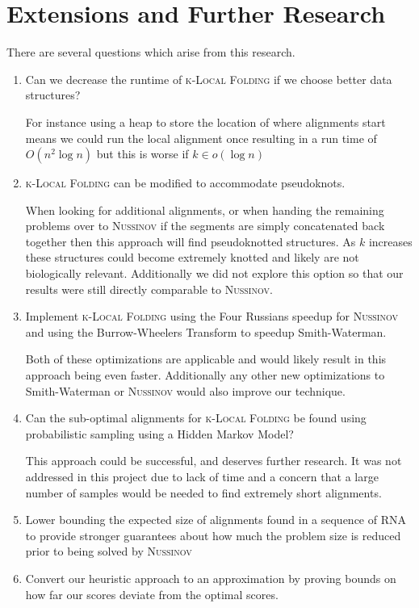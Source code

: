 \documentclass[11pt]{article}
\newcommand{\klf}{\textsc{k-Local Folding}\xspace}
\newcommand{\rf}{\textsc{Nussinov}\xspace}
\begin{document}
\section{Extensions and Further Research}
There are several questions which arise from this research. 
\begin{enumerate}
\item Can we decrease the runtime of \klf if we choose better data structures?

\vskip 0.25cm

For instance using a heap to store the location of where alignments start means we could run the local alignment once resulting in a run time of $O(n^{2}\log n)$ but this is worse if $k \in o(\log n)$


\item \klf can be modified to accommodate pseudoknots. 

\vskip 0.25cm

When looking for additional alignments, or when handing the remaining problems over to \rf if the segments are simply concatenated back together then this approach will find pseudoknotted structures. As $k$ increases these structures could become extremely knotted and likely are not biologically relevant. Additionally we did not explore this option so that our results were still directly comparable to \rf. 


\item Implement \klf using the Four Russians speedup for \rf and using the Burrow-Wheelers Transform to speedup Smith-Waterman.

\vskip 0.25cm

Both of these optimizations are applicable and would likely result in this approach being even faster. Additionally any other new optimizations to Smith-Waterman or \rf would also improve our technique. 

\item Can the sub-optimal alignments for \klf be found using probabilistic sampling using a Hidden Markov Model?

\vskip 0.25cm

This approach could be successful, and deserves further research. It was not addressed in this project due to lack of time and a concern that a large number of samples would be needed to find extremely short alignments. 

\item
Lower bounding the expected size of alignments found in a sequence of RNA to provide stronger guarantees about how much the problem size is reduced prior to being solved by \rf

\item 
Convert our heuristic approach to an approximation by proving bounds on how far our scores deviate from the optimal scores. 

\end{enumerate}




\end{document}

